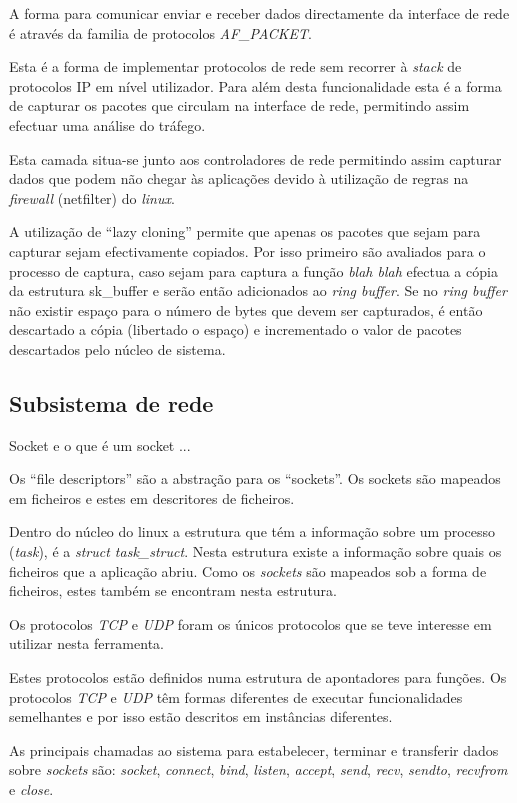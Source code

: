 A forma para comunicar enviar e receber dados directamente da interface de rede
é através da familia de protocolos \textit{AF\_PACKET}. 

Esta é a forma de implementar protocolos de rede sem recorrer à \textit{stack}
de protocolos IP em nível utilizador. Para além desta funcionalidade esta é a
forma de capturar os pacotes que circulam na interface de rede, permitindo
assim efectuar uma análise do tráfego.

Esta camada situa-se junto aos controladores de rede permitindo assim capturar
dados que podem não chegar às aplicações devido à utilização de regras na
\textit{firewall} (netfilter) do \textit{linux}.

A utilização de ``lazy cloning'' permite que apenas os pacotes que sejam para
capturar sejam efectivamente copiados. Por isso primeiro são avaliados para o
processo de captura, caso sejam para captura a função \textit{blah blah}
efectua a cópia da estrutura sk\_buffer e serão então adicionados ao
\textit{ring buffer}. Se no \textit{ring buffer} não existir espaço para o
número de bytes que devem ser capturados, é então descartado a cópia
(libertado o espaço) e incrementado o valor de pacotes descartados pelo núcleo
de sistema.


\subsection{Subsistema de rede} %
\label{subsection:network}
Socket  e o que é um socket ...

Os ``file descriptors'' são a abstração para os ``sockets''. Os sockets são
mapeados em ficheiros e estes em descritores de ficheiros. 

Dentro do núcleo do linux a estrutura que tém a informação sobre um processo
(\textit{task}), é a \textit{struct task\_struct}. Nesta estrutura existe a
informação sobre quais os ficheiros que a aplicação abriu. Como os
\textit{sockets} são mapeados sob a forma de ficheiros, estes também se
encontram nesta estrutura.

Os protocolos \textit{TCP} e \textit{UDP} foram os únicos protocolos que se teve
interesse em utilizar nesta ferramenta.

Estes protocolos estão definidos numa estrutura de apontadores para funções.
Os protocolos \textit{TCP} e \textit{UDP} têm formas diferentes de executar
funcionalidades semelhantes e por isso estão descritos em instâncias diferentes.

As principais chamadas ao sistema para estabelecer, terminar e transferir dados
sobre \textit{sockets} são: \textit{socket}, \textit{connect}, \textit{bind},
\textit{listen}, \textit{accept}, \textit{send}, \textit{recv}, \textit{sendto},
\textit{recvfrom} e \textit{close}. 

